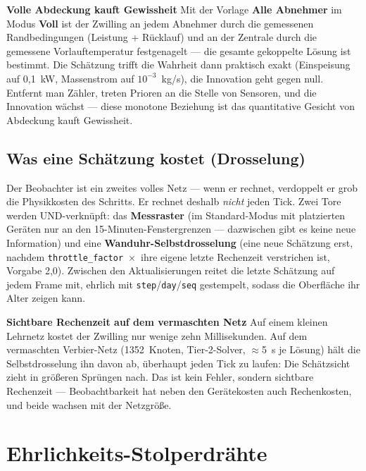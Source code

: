 \documentclass[11pt,a4paper,parskip=half]{scrreprt}
\newcommand{\ui}[1]{\textsf{\bfseries #1}}
\newenvironment{beispiel}[1][Beispiel]
  {\par\medskip{\color{bsp}\hrule height 0.8pt}\nopagebreak\smallskip
   \noindent\textbf{\textsf{\textcolor{bsp}{#1}}}\quad\ignorespaces}
  {\par\nopagebreak\smallskip{\color{bsp}\hrule height 0.8pt}\par\medskip}
\begin{document}
\begin{beispiel}[Volle Abdeckung kauft Gewissheit]
Mit der Vorlage \ui{Alle Abnehmer} im Modus \ui{Voll} ist der Zwilling an
jedem Abnehmer durch die gemessenen Randbedingungen (Leistung + Rücklauf) und
an der Zentrale durch die gemessene Vorlauftemperatur festgenagelt --- die
gesamte gekoppelte Lösung ist bestimmt. Die Schätzung trifft die Wahrheit dann
praktisch exakt (Einspeisung auf 0{,}1~kW, Massenstrom auf $10^{-3}$~kg/s), die
Innovation geht gegen null. Entfernt man Zähler, treten Prioren an die Stelle
von Sensoren, und die Innovation wächst --- diese monotone Beziehung ist das
quantitative Gesicht von \glqq Abdeckung kauft Gewissheit\grqq.
\end{beispiel}

\subsection*{Was eine Schätzung kostet (Drosselung)}

Der Beobachter ist ein zweites volles Netz --- wenn er rechnet, verdoppelt er
grob die Physikkosten des Schritts. Er rechnet deshalb \emph{nicht} jeden Tick.
Zwei Tore werden UND-verknüpft: das \textbf{Messraster} (im Standard-Modus mit
platzierten Geräten nur an den 15-Minuten-Fenstergrenzen --- dazwischen gibt es
keine neue Information) und eine \textbf{Wanduhr-Selbstdrosselung} (eine neue
Schätzung erst, nachdem \texttt{throttle\_factor}~$\times$~ihre eigene letzte
Rechenzeit verstrichen ist, Vorgabe 2{,}0). Zwischen den Aktualisierungen reitet
die letzte Schätzung auf jedem Frame mit, ehrlich mit \texttt{step}/\texttt{day}/\texttt{seq}
gestempelt, sodass die Oberfläche ihr Alter zeigen kann.

\begin{beispiel}[Sichtbare Rechenzeit auf dem vermaschten Netz]
Auf einem kleinen Lehrnetz kostet der Zwilling nur wenige zehn Millisekunden.
Auf dem vermaschten Verbier-Netz (1352~Knoten, Tier-2-Solver, $\approx$5~s je
Lösung) hält die Selbstdrosselung ihn davon ab, überhaupt jeden Tick zu
laufen: Die Schätzsicht zieht in größeren Sprüngen nach. Das ist kein Fehler,
sondern sichtbare Rechenzeit --- Beobachtbarkeit hat neben den Gerätekosten
auch Rechenkosten, und beide wachsen mit der Netzgröße.
\end{beispiel}

\section{Ehrlichkeits-Stolperdrähte}
\label{sec:stolperdraehte}
\end{document}
